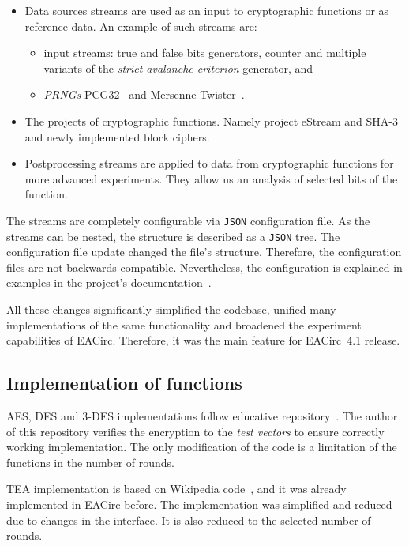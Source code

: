 \documentclass[
    digital,    %
    oneside,    %
    color,
    11pt,
    nocover,
    notable,
    nolof,
    nolot,
]{fithesis3}
\begin{document}
\begin{itemize}
    \item Data sources streams are used as an input to cryptographic functions or as reference data. An example of such streams are:
    \begin{itemize}
        \item input streams: true and false bits generators, counter and multiple variants of the \textit{strict avalanche criterion} generator, and
        \item \textit{PRNGs} PCG32~\cite{pcgGen} and Mersenne Twister~\cite{matsumoto1998mersenne}.
    \end{itemize}
    \item The projects of cryptographic functions. Namely project eStream and SHA-3 and newly implemented block ciphers.
    \item Postprocessing streams are applied to data from cryptographic functions for more advanced experiments. They allow us an analysis of selected bits of the function.
\end{itemize}

The streams are completely configurable via \texttt{JSON} configuration file. As the streams can be nested, the structure is described as a \texttt{JSON} tree. The configuration file update changed the file's structure. Therefore, the configuration files are not backwards compatible. Nevertheless, the configuration is explained in examples in the project's documentation~\cite{EACirc-wiki-streams}.

All these changes significantly simplified the codebase, unified many implementations of the same functionality and broadened the experiment capabilities of EACirc. Therefore, it was the main feature for EACirc~4.1 release.

\subsection{Implementation of functions}
\label{subsec:method-data-funcs}

AES, DES and 3-DES implementations follow educative repository~\cite{cryptoFunc}. The author of this repository verifies the encryption to the \textit{test vectors} to ensure correctly working implementation. The only modification of the code is a limitation of the functions in the number of rounds.

TEA implementation is based on Wikipedia code~\cite{teaWiki}, and it was already implemented in EACirc before. The implementation was simplified and reduced due to changes in the interface. It is also reduced to the selected number of rounds.
\end{document}
